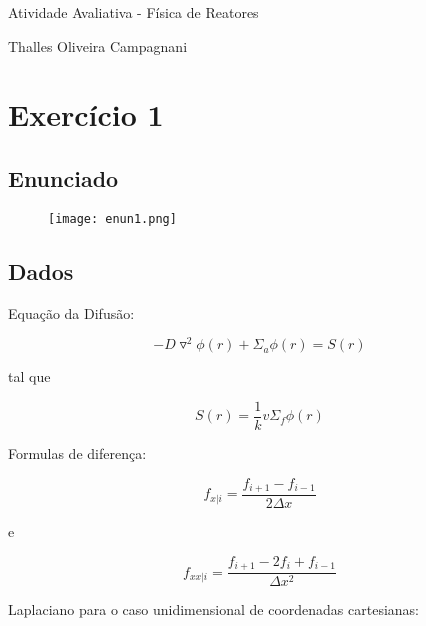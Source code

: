 \documentclass{article}
\begin{document}
    \center
    {\huge Atividade Avaliativa - Física de Reatores }
    
    {Thalles Oliveira Campagnani}

    \raggedright
    \section{Exercício 1}

        \subsection{Enunciado}
            \begin{figure}[ht]
                \centering
                \texttt{[image: enun1.png]}
                \centering 
                \label{nuclelink_fechado}
            \end{figure}
        \subsection{Dados}

            Equação da Difusão:
        
            \begin{equation}
                -D \triangledown^2 \phi (r) + \Sigma_a \phi(r) = S(r)
            \end{equation}
    
            tal que
    
            \begin{equation}
                S(r) = \frac{1}{k} v \Sigma_f \phi(r)
            \end{equation}

            Formulas de diferença:
        
            \begin{equation}
                f_{x|i} = \frac{f_{i+1} - f_{i-1}}{2 \Delta x} 
            \end{equation}
            
            e
            
            \begin{equation}
                f_{xx|i} = \frac{f_{i+1} - 2 f_i + f_{i-1}}{\Delta x^2} 
            \end{equation}

            Laplaciano para o caso unidimensional de coordenadas cartesianas:
\end{document}
